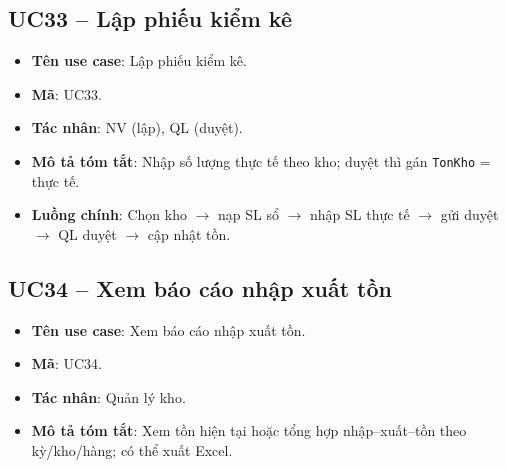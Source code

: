 \subsection{UC33 -- Lập phiếu kiểm kê}

\begin{itemize}[leftmargin=1.5cm]
    \item \textbf{Tên use case}: Lập phiếu kiểm kê.
    \item \textbf{Mã}: UC33.
    \item \textbf{Tác nhân}: NV (lập), QL (duyệt).
    \item \textbf{Mô tả tóm tắt}: Nhập số lượng thực tế theo kho; duyệt thì gán \texttt{TonKho} = thực tế.
    \item \textbf{Luồng chính}: Chọn kho $\rightarrow$ nạp SL sổ $\rightarrow$ nhập SL thực tế $\rightarrow$ gửi duyệt $\rightarrow$ QL duyệt $\rightarrow$ cập nhật tồn.
\end{itemize}

\subsection{UC34 -- Xem báo cáo nhập xuất tồn}

\begin{itemize}[leftmargin=1.5cm]
    \item \textbf{Tên use case}: Xem báo cáo nhập xuất tồn.
    \item \textbf{Mã}: UC34.
    \item \textbf{Tác nhân}: Quản lý kho.
    \item \textbf{Mô tả tóm tắt}: Xem tồn hiện tại hoặc tổng hợp nhập--xuất--tồn theo kỳ/kho/hàng; có thể xuất Excel.
\end{itemize}

